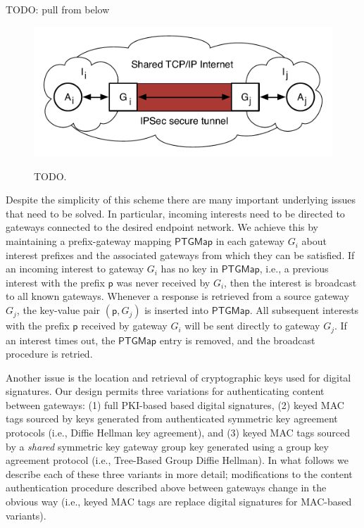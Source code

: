 TODO: pull from below

\begin{figure}[ht!]
\begin{center}
\includegraphics[scale=0.45]{./images/island_tunnel.pdf}
\label{fig:islands}
\caption{TODO.}
\end{center}
\end{figure}

Despite the simplicity of this scheme there are many important underlying issues that need to be solved. In particular, incoming interests need to be directed to gateways connected to the desired endpoint network. We achieve this by maintaining a prefix-gateway mapping $\mathsf{PTGMap}$ in each gateway $G_i$ about interest prefixes and the associated gateways from which they can be satisfied. If an incoming interest to gateway $G_i$ has no key in $\mathsf{PTGMap}$, i.e., a previous interest with the prefix $\mathsf{p}$ was never received by $G_i$, then the interest is broadcast to all known gateways. Whenever a response is retrieved from a source gateway $G_j$, the key-value pair $(\mathsf{p}, G_j)$ is inserted into $\mathsf{PTGMap}$. All subsequent interests with the prefix $\mathsf{p}$ received by gateway $G_i$ will be sent directly to gateway $G_j$. If an interest times out, the $\mathsf{PTGMap}$ entry is removed, and the broadcast procedure is retried. 

Another issue is the location and retrieval of cryptographic keys used for digital signatures. Our design permits three variations for authenticating content between gateways: (1) full PKI-based based digital signatures, (2) keyed MAC tags sourced by keys generated from authenticated symmetric key agreement protocols (i.e., Diffie Hellman key agreement), and (3) keyed MAC tags sourced by a \emph{shared} symmetric key gateway group key generated using a group key agreement protocol (i.e., Tree-Based Group Diffie Hellman). In what follows we describe each of these three variants in more detail; modifications to the content authentication procedure described above between gateways change in the obvious way (i.e., keyed MAC tags are replace digital signatures for MAC-based variants). \\

